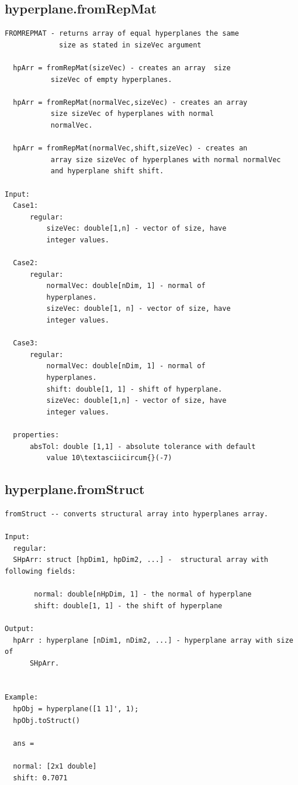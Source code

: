 \documentclass[letterpaper,10pt,english]{sphinxmanual}
\begin{document}
\subsection{hyperplane.fromRepMat}
\label{chap_functions:hyperplane-fromrepmat}
\begin{Verbatim}[commandchars=\\\{\}]
FROMREPMAT - returns array of equal hyperplanes the same
             size as stated in sizeVec argument

  hpArr = fromRepMat(sizeVec) - creates an array  size
           sizeVec of empty hyperplanes.

  hpArr = fromRepMat(normalVec,sizeVec) - creates an array
           size sizeVec of hyperplanes with normal
           normalVec.

  hpArr = fromRepMat(normalVec,shift,sizeVec) - creates an
           array size sizeVec of hyperplanes with normal normalVec
           and hyperplane shift shift.

Input:
  Case1:
      regular:
          sizeVec: double[1,n] - vector of size, have
          integer values.

  Case2:
      regular:
          normalVec: double[nDim, 1] - normal of
          hyperplanes.
          sizeVec: double[1, n] - vector of size, have
          integer values.

  Case3:
      regular:
          normalVec: double[nDim, 1] - normal of
          hyperplanes.
          shift: double[1, 1] - shift of hyperplane.
          sizeVec: double[1,n] - vector of size, have
          integer values.

  properties:
      absTol: double [1,1] - absolute tolerance with default
          value 10\textasciicircum{}(-7)
\end{Verbatim}


\subsection{hyperplane.fromStruct}
\label{chap_functions:hyperplane-fromstruct}
\begin{Verbatim}[commandchars=\\\{\}]
fromStruct -- converts structural array into hyperplanes array.

Input:
  regular:
  SHpArr: struct [hpDim1, hpDim2, ...] -  structural array with following fields:

       normal: double[nHpDim, 1] - the normal of hyperplane
       shift: double[1, 1] - the shift of hyperplane

Output:
  hpArr : hyperplane [nDim1, nDim2, ...] - hyperplane array with size of
      SHpArr.


Example:
  hpObj = hyperplane([1 1]', 1);
  hpObj.toStruct()

  ans =

  normal: [2x1 double]
  shift: 0.7071
\end{Verbatim}
\end{document}
